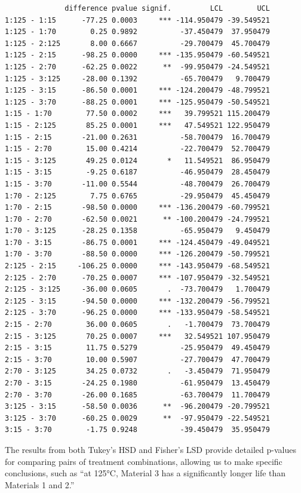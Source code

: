\documentclass[
  letterpaper,
  DIV=11,
  numbers=noendperiod]{scrreprt}
\begin{document}
\begin{verbatim}
              difference pvalue signif.         LCL        UCL
1:125 - 1:15      -77.25 0.0003     *** -114.950479 -39.549521
1:125 - 1:70        0.25 0.9892          -37.450479  37.950479
1:125 - 2:125       8.00 0.6667          -29.700479  45.700479
1:125 - 2:15      -98.25 0.0000     *** -135.950479 -60.549521
1:125 - 2:70      -62.25 0.0022      **  -99.950479 -24.549521
1:125 - 3:125     -28.00 0.1392          -65.700479   9.700479
1:125 - 3:15      -86.50 0.0001     *** -124.200479 -48.799521
1:125 - 3:70      -88.25 0.0001     *** -125.950479 -50.549521
1:15 - 1:70        77.50 0.0002     ***   39.799521 115.200479
1:15 - 2:125       85.25 0.0001     ***   47.549521 122.950479
1:15 - 2:15       -21.00 0.2631          -58.700479  16.700479
1:15 - 2:70        15.00 0.4214          -22.700479  52.700479
1:15 - 3:125       49.25 0.0124       *   11.549521  86.950479
1:15 - 3:15        -9.25 0.6187          -46.950479  28.450479
1:15 - 3:70       -11.00 0.5544          -48.700479  26.700479
1:70 - 2:125        7.75 0.6765          -29.950479  45.450479
1:70 - 2:15       -98.50 0.0000     *** -136.200479 -60.799521
1:70 - 2:70       -62.50 0.0021      ** -100.200479 -24.799521
1:70 - 3:125      -28.25 0.1358          -65.950479   9.450479
1:70 - 3:15       -86.75 0.0001     *** -124.450479 -49.049521
1:70 - 3:70       -88.50 0.0000     *** -126.200479 -50.799521
2:125 - 2:15     -106.25 0.0000     *** -143.950479 -68.549521
2:125 - 2:70      -70.25 0.0007     *** -107.950479 -32.549521
2:125 - 3:125     -36.00 0.0605       .  -73.700479   1.700479
2:125 - 3:15      -94.50 0.0000     *** -132.200479 -56.799521
2:125 - 3:70      -96.25 0.0000     *** -133.950479 -58.549521
2:15 - 2:70        36.00 0.0605       .   -1.700479  73.700479
2:15 - 3:125       70.25 0.0007     ***   32.549521 107.950479
2:15 - 3:15        11.75 0.5279          -25.950479  49.450479
2:15 - 3:70        10.00 0.5907          -27.700479  47.700479
2:70 - 3:125       34.25 0.0732       .   -3.450479  71.950479
2:70 - 3:15       -24.25 0.1980          -61.950479  13.450479
2:70 - 3:70       -26.00 0.1685          -63.700479  11.700479
3:125 - 3:15      -58.50 0.0036      **  -96.200479 -20.799521
3:125 - 3:70      -60.25 0.0029      **  -97.950479 -22.549521
3:15 - 3:70        -1.75 0.9248          -39.450479  35.950479
\end{verbatim}

The results from both Tukey's HSD and Fisher's LSD provide detailed
p-values for comparing pairs of treatment combinations, allowing us to
make specific conclusions, such as ``at 125°C, Material 3 has a
significantly longer life than Materials 1 and 2.''
\end{document}
